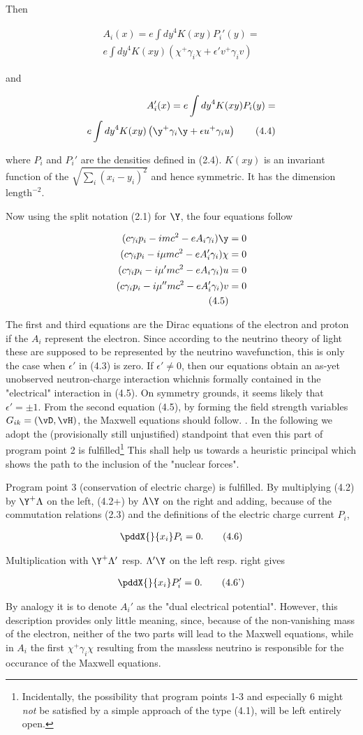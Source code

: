 \documentclass{article}
\newcommand{\nequ}[2]{
\begin{align*}
#1
\tag{#2}
\end{align*}
}
\newcommand{\sumX}[1]{\underset{#1}{\sum}}
\begin{document}
Then
\nequ{
A_i(x) = e\int{dy}^4 K(xy) P_i'(y) =\\
e\int{dy}^4 K(xy)\left(\chi^+ \gamma_i \chi + \epsilon' v^+ \gamma_i v\right)
}{4.3}
and
\nequ{
A_i'(x) = e\int{dy}^4 K(xy) P_i(y) =\\
e\int{dy}^4 K(xy)\left(\y^+ \gamma_i \y + \epsilon u^+ \gamma_i u\right)
}{4.4}
where $P_i$ and $P_i'$ are the densities defined in (2.4). $K(xy)$ is an invariant function of the  $\sqrt{\sumX{i}(x_i - y_i)^2}$ and hence symmetric. It has the dimension $\text{length}^{-2}$.

Now using the split notation (2.1) for $\Y$, the four equations follow
\nequ{
(c\gamma_i p_i - imc^2 - eA_i\gamma_i)\y &= 0\\
(c\gamma_i p_i - i\mu mc^2 - eA_i' \gamma_i) \chi &= 0\\
(c\gamma_i p_i - i\mu' mc^2 - eA_i \gamma_i) u &= 0\\
(c\gamma_i p_i - i\mu'' mc^2 - eA_i' \gamma_i) v &= 0\\
}{4.5}

The first and third equations are the Dirac equations of the electron and proton if the $A_i$ represent the electron. Since according to the neutrino theory of light these are supposed to be represented by the neutrino wavefunction, this is only the case when $\epsilon'$ in (4.3) is zero. If $\epsilon' \neq 0$, then our equations obtain an as-yet unobserved neutron-charge interaction whichnis formally contained in the "electrical" interaction in (4.5). On symmetry grounds, it seems likely that $\epsilon' = \pm 1$. From the second equation (4.5), by forming the field strength variables $G_{ik} = (\vD, \vH)$, the Maxwell equations should follow. . In the following we adopt the (provisionally still unjustified) standpoint that even this part of program point 2 is fulfilled\footnote{Incidentally, the possibility that program points 1-3 and especially 6 might \textit{not} be satisfied by a simple approach of the type (4.1), will be left entirely open.} This shall help us towards a heuristic principal which shows the path to the inclusion of the "nuclear forces".

Program point 3 (conservation of electric charge) is fulfilled. By multiplying (4.2) by $\Y^+\Lambda$ on the left, (4.2+) by $\Lambda\Y$ on the right and adding, because of the commutation relations (2.3) and the definitions of the electric charge current $P_i$, 
\nequ{
\pddX{}{x_i}P_i = 0.
}{4.6}
Multiplication with $\Y^+\Lambda'$ resp. $\Lambda'\Y$ on the left resp. right gives
\nequ{
\pddX{}{x_i}P_i' = 0.
}{4.6'}
By analogy it is  to denote $A_i'$ as the "dual electrical potential". However, this description provides only little meaning, since, because of the non-vanishing mass of the electron, neither of the two parts will lead to the Maxwell equations, while in $A_i$ the first  $\chi^+ \gamma_i \chi$ resulting from the massless neutrino is responsible for the occurance of the Maxwell equations.
\end{document}
